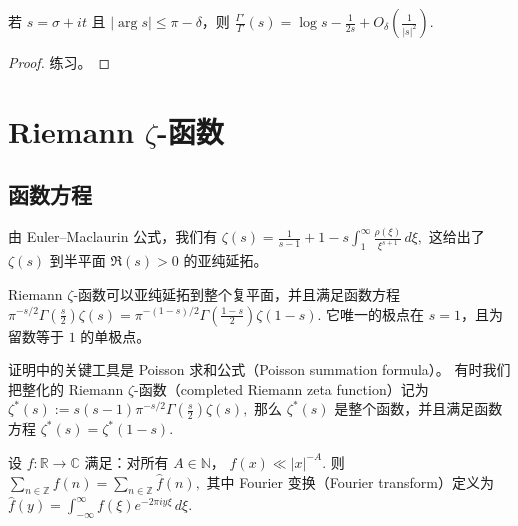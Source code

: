 \begin{corollary}[原文 Corollary 7.9]
	若 $s=\sigma+it$ 且 $|\arg s|\leq \pi-\delta$，则
	\(\textstyle \frac{\Gamma'}{\Gamma}(s) =\allowbreak{} \log s-\frac{1}{2s} +\allowbreak{} O_\delta\left(\frac{1}{|s|^2}\right).\)
\end{corollary}

\begin{proof}
	练习。
\end{proof}

\chapter{\texorpdfstring{Riemann \(\zeta\)-函数}{Riemann zeta-函数}}
\label{chap:riemann-zeta-function}

\section{函数方程}

由 Euler--Maclaurin 公式，我们有
\(\textstyle \zeta(s) =\allowbreak{} \frac{1}{s-1}+\allowbreak{}1 -s\int_1^\infty \frac{\rho(\xi)}{\xi^{s+\allowbreak{}1}}\,d\xi,\allowbreak{}\)
这给出了 $\zeta(s)$ 到半平面 $\Re(s)>0$ 的亚纯延拓。

\begin{theorem}[原文 Theorem 8.1]
	Riemann $\zeta$-函数可以亚纯延拓到整个复平面，并且满足函数方程
	\(\textstyle \pi^{-s/2}\Gamma\left(\frac{s}{2}\right)\zeta(s) =\allowbreak{} \pi^{-(1-s)/2} \Gamma\left(\frac{1-s}{2}\right)\zeta(1-s).\)
	它唯一的极点在 $s=1$，且为留数等于 $1$ 的单极点。
\end{theorem}

\begin{remark}
	证明中的关键工具是 Poisson 求和公式（Poisson summation formula）。
	有时我们把整化的 Riemann $\zeta$-函数（completed Riemann zeta function）记为
	\(\textstyle \zeta^*(s):=\allowbreak{} s(s-1)\pi^{-s/2}\Gamma\left(\frac{s}{2}\right)\zeta(s),\allowbreak{}\)
	那么 $\zeta^*(s)$ 是整个函数，并且满足函数方程
	\(\textstyle \zeta^*(s)=\allowbreak{}\zeta^*(1-s).\)
\end{remark}

\begin{theorem}
	设 $f:\mathbb R\to\mathbb C$ 满足：对所有 $A\in\mathbb N$，
	\(\textstyle f(x)\ll\allowbreak{} |x|^{-A}.\)
	则
	\(\textstyle \sum_{n\in\mathbb Z}f(n) =\allowbreak{} \sum_{n\in\mathbb Z}\widehat f(n),\allowbreak{}\)
	其中 Fourier 变换（Fourier transform）定义为
	\(\textstyle \widehat f(y) =\allowbreak{} \int_{-\infty}^{\infty} f(\xi)e^{-2\pi i y\xi}\,d\xi.\)
\end{theorem}

